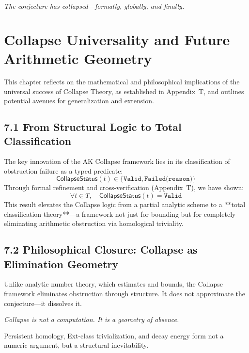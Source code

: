\documentclass[11pt]{article}
\begin{document}
\begin{center}
\textit{The conjecture has collapsed—formally, globally, and finally.}
\end{center}



\section{Collapse Universality and Future Arithmetic Geometry}

This chapter reflects on the mathematical and philosophical implications of the universal success of Collapse Theory, as established in Appendix~T, and outlines potential avenues for generalization and extension.

\subsection{7.1 From Structural Logic to Total Classification}

The key innovation of the AK Collapse framework lies in its classification of obstruction failure as a typed predicate:
\[
\mathsf{CollapseStatus}(t) \in \{ \texttt{Valid}, \texttt{Failed(reason)} \}
\]
Through formal refinement and cross-verification (Appendix~T), we have shown:
\[
\forall t \in T,\quad \mathsf{CollapseStatus}(t) = \texttt{Valid}
\]
This result elevates the Collapse logic from a partial analytic scheme to a **total classification theory**—a framework not just for bounding but for completely eliminating arithmetic obstruction via homological triviality.

\subsection{7.2 Philosophical Closure: Collapse as Elimination Geometry}

Unlike analytic number theory, which estimates and bounds, the Collapse framework eliminates obstruction through structure.  
It does not approximate the conjecture—it dissolves it.

\begin{center}
\textit{Collapse is not a computation. It is a geometry of absence.}
\end{center}

Persistent homology, Ext-class trivialization, and decay energy form not a numeric argument, but a structural inevitability.
\end{document}
